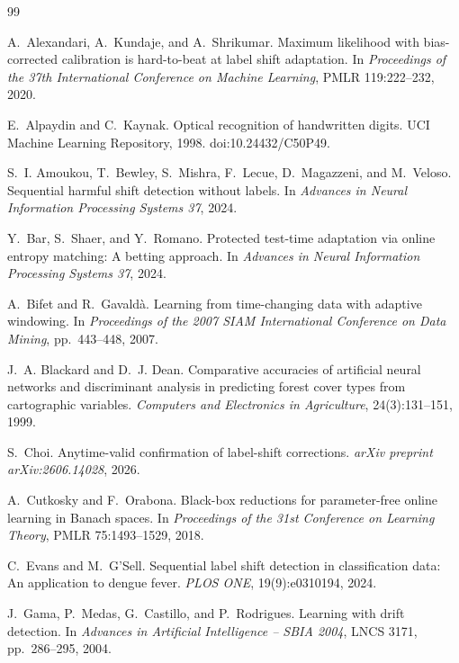 \begin{thebibliography}{99}
\small

A.~Alexandari, A.~Kundaje, and A.~Shrikumar.
Maximum likelihood with bias-corrected calibration is hard-to-beat at label shift adaptation.
In \textit{Proceedings of the 37th International Conference on Machine Learning}, PMLR 119:222--232, 2020.

E.~Alpaydin and C.~Kaynak.
Optical recognition of handwritten digits.
UCI Machine Learning Repository, 1998. doi:10.24432/C50P49.

S.~I. Amoukou, T.~Bewley, S.~Mishra, F.~Lecue, D.~Magazzeni, and M.~Veloso.
Sequential harmful shift detection without labels.
In \textit{Advances in Neural Information Processing Systems 37}, 2024.

Y.~Bar, S.~Shaer, and Y.~Romano.
Protected test-time adaptation via online entropy matching: A betting approach.
In \textit{Advances in Neural Information Processing Systems 37}, 2024.

A.~Bifet and R.~Gavald\`a.
Learning from time-changing data with adaptive windowing.
In \textit{Proceedings of the 2007 SIAM International Conference on Data Mining}, pp.~443--448, 2007.

J.~A. Blackard and D.~J. Dean.
Comparative accuracies of artificial neural networks and discriminant analysis in predicting forest cover types from cartographic variables.
\textit{Computers and Electronics in Agriculture}, 24(3):131--151, 1999.

S.~Choi.
Anytime-valid confirmation of label-shift corrections.
\textit{arXiv preprint arXiv:2606.14028}, 2026.

A.~Cutkosky and F.~Orabona.
Black-box reductions for parameter-free online learning in Banach spaces.
In \textit{Proceedings of the 31st Conference on Learning Theory}, PMLR 75:1493--1529, 2018.

C.~Evans and M.~G'Sell.
Sequential label shift detection in classification data: An application to dengue fever.
\textit{PLOS ONE}, 19(9):e0310194, 2024.

J.~Gama, P.~Medas, G.~Castillo, and P.~Rodrigues.
Learning with drift detection.
In \textit{Advances in Artificial Intelligence -- SBIA 2004}, LNCS 3171, pp.~286--295, 2004.


\end{thebibliography}
